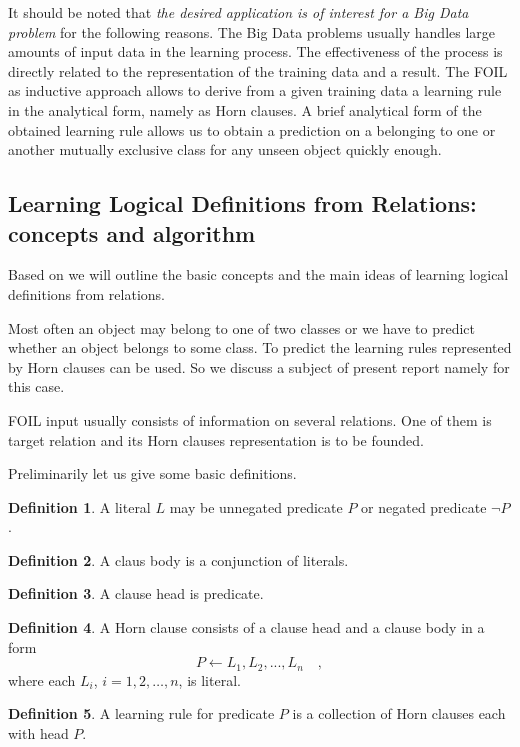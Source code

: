 \documentclass{scrartcl}
\begin{document}
It should be noted that \emph{the desired application is of interest for a Big Data problem} for the following reasons.  The Big Data problems usually handles large amounts of input data in the learning process. The effectiveness of the process is directly related to the representation of the training data and a result. The FOIL as inductive approach allows to derive from a given training data a learning rule in the analytical form, namely as  Horn clauses. A brief analytical form of the obtained learning rule allows us  to  obtain a prediction on a belonging to one or another mutually exclusive class for any unseen object quickly enough.


\subsection{Learning Logical Definitions from Relations:
concepts  and algorithm}

Based on \citep{Quinlan1990, Quinlan1993} we will outline the basic concepts and the main ideas of learning logical definitions from relations.

Most often an object may belong to one of two classes
or we have to predict whether an object belongs to some class.
To predict the learning rules represented by Horn clauses can be used.
So we discuss a subject of present report  namely for this case.

FOIL input usually consists of information on several relations. One of them is target relation and its Horn clauses representation is to be founded.

Preliminarily let us give some basic definitions.

\textbf{Definition 1}.
A literal $L$ may be unnegated predicate $P$ or negated predicate $\neg{P}$.

\textbf{Definition 2}.
A claus body is a conjunction of literals.

\textbf{Definition 3}.
A clause head is predicate.

\textbf{Definition 4}.
A Horn clause consists of a clause head and a clause body in a form
\begin{equation}\label{eq0}
P\leftarrow L_1,L_2,..., L_n\quad,
\end{equation}
where each $L_i$, $i=1,2,\ldots, n$, is literal.

\textbf{Definition 5}.
A learning rule for predicate $P$ is
 a collection of Horn clauses each with head $P$.
\end{document}
